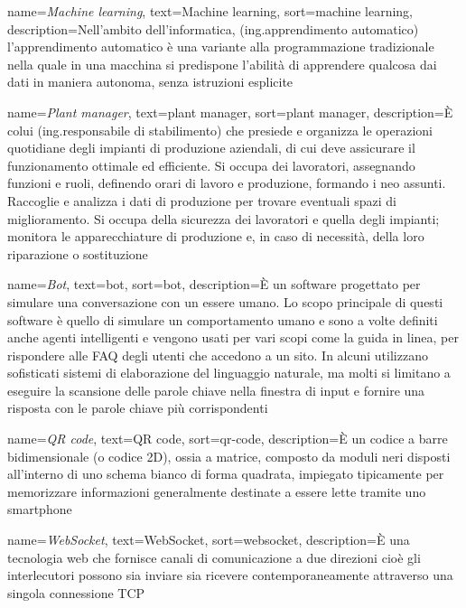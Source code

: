 {
	name={\textit{Machine learning}},
	text=Machine learning,
	sort=machine learning,
	description={Nell'ambito dell'informatica, (ing.apprendimento automatico) l'apprendimento automatico è una variante alla programmazione tradizionale nella quale in una macchina si predispone l'abilità di apprendere qualcosa dai dati in maniera autonoma, senza istruzioni esplicite}
}

{
	name={\textit{Plant manager}},
	text=plant manager,
	sort=plant manager,
	description={È colui (ing.responsabile di stabilimento) che presiede e organizza le operazioni quotidiane degli impianti di produzione aziendali, di cui deve assicurare il funzionamento ottimale ed efficiente. Si occupa dei lavoratori, assegnando funzioni e ruoli, definendo orari di lavoro e produzione, formando i neo assunti. Raccoglie e analizza i dati di produzione per trovare eventuali spazi di miglioramento. Si occupa della sicurezza dei lavoratori e quella degli impianti; monitora le apparecchiature di produzione e, in caso di necessità, della loro riparazione o sostituzione}
}

{
	name={\textit{Bot}},
	text=bot,
	sort=bot,
	description={È un software progettato per simulare una conversazione con un essere umano. Lo scopo principale di questi software è quello di simulare un comportamento umano e sono a volte definiti anche agenti intelligenti e vengono usati per vari scopi come la guida in linea, per rispondere alle FAQ degli utenti che accedono a un sito. In alcuni utilizzano sofisticati sistemi di elaborazione del linguaggio naturale, ma molti si limitano a eseguire la scansione delle parole chiave nella finestra di input e fornire una risposta con le parole chiave più corrispondenti}
}

{
	name={\textit{QR code}},
	text=QR code,
	sort=qr-code,
	description={È un codice a barre bidimensionale (o codice 2D), ossia a matrice, composto da moduli neri disposti all'interno di uno schema bianco di forma quadrata, impiegato tipicamente per memorizzare informazioni generalmente destinate a essere lette tramite uno smartphone}
}

{
	name={\textit{WebSocket}},
	text=WebSocket,
	sort=websocket,
	description={È una tecnologia web che fornisce canali di comunicazione a due direzioni cioè gli interlecutori possono sia inviare sia ricevere contemporaneamente attraverso una singola connessione TCP}
}

